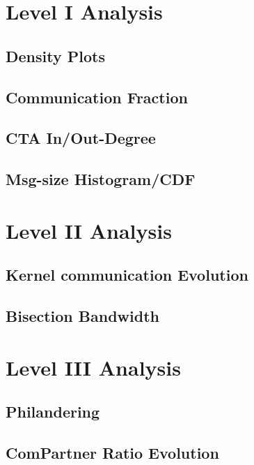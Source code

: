 \section{Level I Analysis}
\subsection{Density Plots}
\subsection{Communication Fraction}
\subsection{CTA In/Out-Degree}
\subsection{Msg-size Histogram/CDF}
\section{Level II Analysis}
\subsection{Kernel communication Evolution}
\subsection{Bisection Bandwidth}
\section{Level III Analysis}
\subsection{Philandering}
\subsection{ComPartner Ratio Evolution}